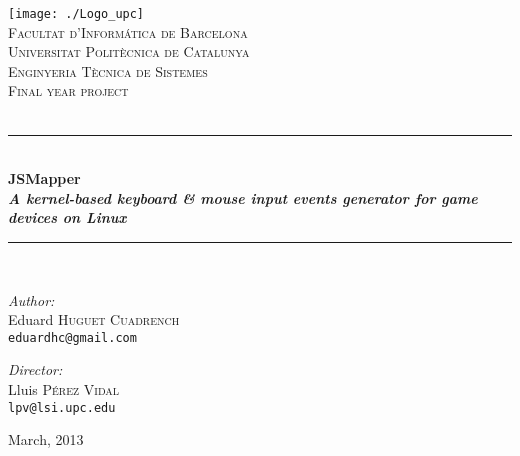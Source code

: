 \begin{titlepage}
\begin{center}

\newcommand{\HRule}{\rule{\linewidth}{0.5mm}}


\texttt{[image: ./Logo\_upc]}~\\[1cm]

\textsc{Facultat d'Informática de Barcelona}\\[0.3cm]
\textsc{Universitat Politècnica de Catalunya}\\[1.5cm]
\textsc{\LARGE Enginyeria Tècnica de Sistemes}\\[1.5cm]

\textsc{\Large Final year project}\\[0.5cm]
\textsc{}\\[0.5cm]

\HRule \\[0.4cm]
{
  \huge\bfseries {JSMapper}\\[0.3cm]
  \small\normalfont\textit{A kernel-based keyboard \& mouse input events generator for game devices on Linux}
}
\HRule \\[1.5cm]

\begin{minipage}{0.4\textwidth}
\begin{flushleft}\small
\emph{Author:}\\
Eduard \textsc{Huguet Cuadrench}\\
\texttt{eduardhc@gmail.com}
\end{flushleft}
\end{minipage}
\begin{minipage}{0.4\textwidth}
\begin{flushright}\small
\emph{Director:} \\
Lluis \textsc{Pérez Vidal}\\
\texttt{lpv@lsi.upc.edu}
\end{flushright}
\end{minipage}

\vfill

{\large March, 2013}

\end{center}
\end{titlepage}
